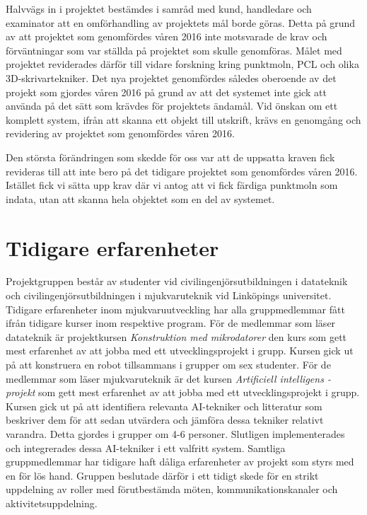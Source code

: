 Halvvägs in i projektet bestämdes i samråd med kund, handledare och examinator att en omförhandling av projektets mål borde göras. Detta på grund av att projektet som genomfördes våren 2016 inte motsvarade de krav och förväntningar som var ställda på projektet som skulle genomföras. Målet med projektet reviderades därför till vidare forskning kring punktmoln, PCL och olika 3D-skrivartekniker. Det nya projektet genomfördes således oberoende av det projekt som gjordes våren 2016 på grund av att det systemet inte gick att använda på det sätt som krävdes för projektets ändamål. Vid önskan om ett komplett system, ifrån att skanna ett objekt till utskrift, krävs en genomgång och revidering av projektet som genomfördes våren 2016.

Den största förändringen som skedde för oss var att de uppsatta kraven fick revideras till att inte bero på det tidigare projektet som genomfördes våren 2016. Istället fick vi sätta upp krav där vi antog att vi fick färdiga punktmoln som indata, utan att skanna hela objektet som en del av systemet.

\section{Tidigare erfarenheter}
Projektgruppen består av studenter vid civilingenjörsutbildningen i datateknik och civilingenjörsutbildningen i mjukvaruteknik vid Linköpings universitet. Tidigare erfarenheter inom mjukvaruutveckling har alla gruppmedlemmar fått ifrån tidigare kurser inom respektive program. För de medlemmar som läser datateknik är projektkursen \textit{Konstruktion med mikrodatorer} den kurs som gett mest erfarenhet av att jobba med ett utvecklingsprojekt i grupp. Kursen gick ut på att konstruera en robot tillsammans i grupper om sex studenter. För de medlemmar som läser mjukvaruteknik är det kursen \textit{Artificiell intelligens - projekt} som gett mest erfarenhet av att jobba med ett utvecklingsprojekt i grupp. Kursen gick ut på att identifiera relevanta AI-tekniker och litteratur som beskriver dem för att sedan utvärdera och jämföra dessa tekniker relativt varandra. Detta gjordes i grupper om 4-6 personer. Slutligen implementerades och integrerades dessa AI-tekniker i ett valfritt system. Samtliga gruppmedlemmar har tidigare haft dåliga erfarenheter av projekt som styrs med en för lös hand. Gruppen beslutade därför i ett tidigt skede för en strikt uppdelning av roller med förutbestämda möten, kommunikationskanaler och aktivitetsuppdelning.

